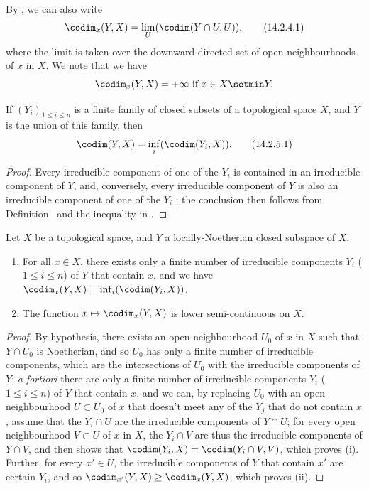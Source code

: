 By , we can also write
\[
\label{0.14.2.4.1}
  \codim_x(Y,X)=\lim_U(\codim(Y\cap U,U)),
  \tag{14.2.4.1}
\]
where the limit is taken over the downward-directed set of open neighbourhoods of $x$ in $X$.
We note that we have
\[
  \codim_x(Y,X)=+\infty\text{ if }x\in X\setmin Y.
\]

\begin{proposition}[14.2.5]
\label{0.14.2.5}
If $(Y_i)_{1\leq i\leq n}$ is a finite family of closed subsets of a topological space $X$, and $Y$ is the union of this family, then
\[
\label{0.14.2.5.1}
  \codim(Y,X)=\inf_i(\codim(Y_i,X)).
  \tag{14.2.5.1}
\]
\end{proposition}

\begin{proof}
Every irreducible component of one of the $Y_i$ is contained in an irreducible component of $Y$, and, conversely, every irreducible component of $Y$ is also an irreducible component of one of the $Y_i$ ;
the conclusion then follows from Definition~ and the inequality in .
\end{proof}

\begin{corollary}[14.2.6]
\label{0.14.2.6}
Let $X$ be a topological space, and $Y$ a locally-Noetherian closed subspace of $X$.
\begin{enumerate}
  \item[{\rm(i)}] For all $x\in X$, there exists only a finite number of irreducible components $Y_i$ ($1\leq i\leq n$) of $Y$ that contain $x$, and we have $\codim_x(Y,X)=\inf_i(\codim(Y_i,X))$.
  \item[{\rm(ii)}] The function $x\mapsto\codim_x(Y,X)$ is lower semi-continuous on $X$.
\end{enumerate}
\end{corollary}

\begin{proof}
By hypothesis, there exists an open neighbourhood $U_0$ of $x$ in $X$ such that $Y\cap U_0$ is Noetherian, and so $U_0$ has only a finite number of irreducible components, which are the intersections of $U_0$ with the irreducible components of $Y$;
\emph{a fortiori} there are only a finite number of irreducible components $Y_i$ ($1\leq i\leq n$) of $Y$ that contain $x$, and we can, by replacing $U_0$ with an open neighbourhood $U\subset U_0$ of $x$ that doesn't meet any of the $Y_j$ that do not contain $x$, assume that the $Y_i\cap U$ are the irreducible components of $Y\cap U$;
for every open neighbourhood $V\subset U$ of $x$ in $X$, the $Y_i\cap V$ are thus the irreducible components of $Y\cap V$, and  then shows that $\codim(Y_i,X)=\codim(Y_i\cap V,V)$, which proves (i).
Further, for every $x'\in U$, the irreducible components of $Y$ that contain $x'$ are certain $Y_i$, and so $\codim_{x'}(Y,X)\geq\codim_x(Y,X)$, which proves (ii).
\end{proof}

